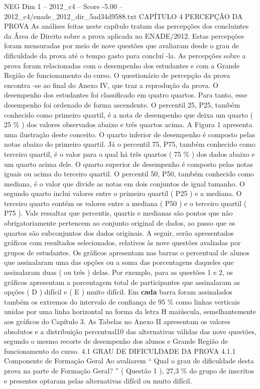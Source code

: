 \begin{textsample}{NEG Dim 1 – 2012\_c4 – Score -5.00 – 2012\_c4/enade\_2012\_dir\_5ad34d9588.txt}  \label{ex:f1_neg_079}
CAPÍTULO 4 PERCEPÇÃO DA PROVA As análises feitas neste capítulo tratam das percepções dos concluintes da Área de Direito sobre a prova aplicada no ENADE/2012.
Estas percepções foram mensuradas por meio de nove questões que avaliaram desde o grau de dificuldade da prova até o tempo gasto para concluí -la.
As percepções sobre a prova foram relacionadas com o desempenho dos estudantes e com a Grande Região de funcionamento do curso.
O questionário de percepção da prova encontra -se ao final do Anexo IV, que traz a reprodução da prova.
O desempenho dos estudantes foi classificado em quatro quartos.
Para tanto, esse desempenho foi ordenado de forma ascendente.
O percentil 25, P25, também conhecido como primeiro quartil, é a nota de desempenho que deixa um quarto ( 25 \% ) dos valores observados abaixo e três quartos acima.
A Figura 1 apresenta uma ilustração deste conceito.
O quarto inferior de desempenho é composto pelas notas abaixo do primeiro quartil.
Já o percentil 75, P75, também conhecido como terceiro quartil, é o valor para o qual há três quartos ( 75 \% ) dos dados abaixo e um quarto acima dele.
O quarto superior de desempenho é composto pelas notas iguais ou acima do terceiro quartil.
O percentil 50, P50, também conhecido como mediana, é o valor que divide as notas em dois conjuntos de igual tamanho.
O segundo quarto inclui valores entre o primeiro quartil ( P25 ) e a mediana.
O terceiro quarto contém os valores entre a mediana ( P50 ) e o terceiro quartil ( P75 ).
Vale ressaltar que percentis, quartis e medianas são pontos que não obrigatoriamente pertencem ao conjunto original de dados, ao passo que os quartos são subconjuntos dos dados originais.
A seguir, serão apresentados gráficos com resultados selecionados, relativos às nove questões avaliadas por grupos de estudantes.
Os gráficos apresentam nas barras o percentual de alunos que assinalaram uma das opções ou a soma das porcentagens daqueles que assinalaram duas ( ou três ) delas.
Por exemplo, para as questões 1 e 2, os gráficos apresentam a porcentagem total de participantes que assinalaram as opções ( D ) difícil e ( E ) muito difícil.
Em \textbf{cada} barra foram assinalados também os extremos do intervalo de confiança de 95 \% como linhas verticais unidas por uma linha horizontal na forma da letra H maiúscula, semelhantemente aos gráficos do Capítulo 3.
As Tabelas no Anexo II apresentam os valores absolutos e a distribuição percentual10 das alternativas válidas das nove questões, segundo o mesmo recorte de desempenho dos alunos e Grande Região de funcionamento do curso. 4.1 GRAU DE DIFICULDADE DA PROVA 4.1.1 Componente de Formação Geral Ao avaliarem “ Qual o grau de dificuldade desta prova na parte de Formação Geral? ” ( Questão 1 ), 27,3 \% do grupo de inscritos e presentes optaram pelas alternativas difícil ou muito difícil.

\end{textsample}
